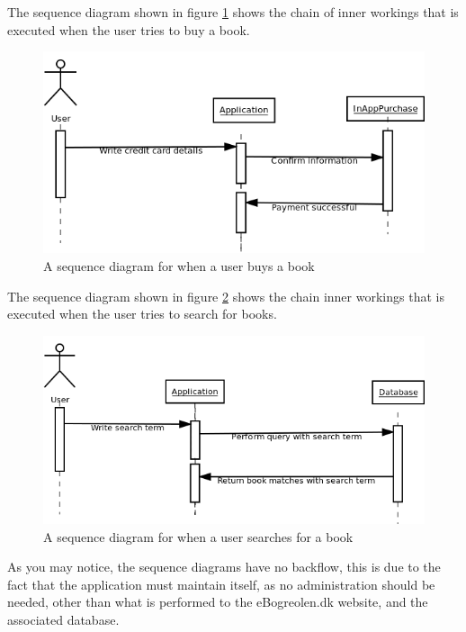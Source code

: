 \message{ !name(Rapport.tex)}\documentclass[12pt]{article}
\begin{document}
The sequence diagram shown in figure \ref{SeqDiaBuyBook} shows the chain of inner workings that is executed when the user tries to buy a book.
\begin{figure}[H]
\includegraphics[scale=0.6]{SequenceDiagramBuyBook.png}
\caption{A sequence diagram for when a user buys a book}
\label{SeqDiaBuyBook}
\end{figure}

The sequence diagram shown in figure \ref{SeqDiaBookSearch} shows the chain inner workings that is executed when the user tries to search for books.
\begin{figure}[H]
\includegraphics[scale=0.6]{SequenceDiagramBookSearch.png}
\caption{A sequence diagram for when a user searches for a book}
\label{SeqDiaBookSearch}
\end{figure}

As you may notice, the sequence diagrams have no backflow, this is due to the fact that the application must maintain itself, as no administration should be needed, other than what is performed to the eBogreolen.dk website, and the associated database.
\end{document}
